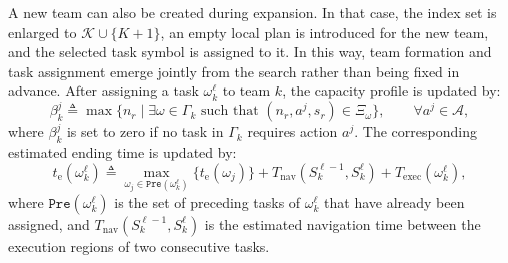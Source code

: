 A new team can also be created during expansion. In that case, the index set is
enlarged to $\mathcal{K}\cup\{K+1\}$, an empty local plan is introduced for the
new team, and the selected task symbol is assigned to it. In this way, team
formation and task assignment emerge jointly from the search rather than being
fixed in advance.
After assigning a task $\omega_k^\ell$ to team $k$, the capacity profile is
updated by:
\begin{equation}
\label{ch04:eq:update-constraint}
\beta_k^j \triangleq
\max\{n_r \mid \exists \omega\in\Gamma_k
\text{ such that } (n_r,a^j,s_r)\in\Xi_\omega\},
\qquad \forall a^j\in\mathcal{A},
\end{equation}
where $\beta_k^j$ is set to zero if no task in $\Gamma_k$ requires action
$a^j$. The corresponding estimated ending time is updated by:
\begin{equation}
\label{ch04:eq:estimated_time}
t_{\mathrm{e}}(\omega_k^\ell) \triangleq
\max_{\omega_j\in\texttt{Pre}(\omega_k^\ell)}
\bigl\{ t_{\mathrm{e}}(\omega_j) \bigr\}
+ T_{\mathrm{nav}}(S_k^{\ell-1},S_k^\ell)
+ T_{\mathrm{exec}}(\omega_k^\ell),
\end{equation}
where $\texttt{Pre}(\omega_k^\ell)$ is the set of preceding tasks of
$\omega_k^\ell$ that have already been assigned, and
$T_{\mathrm{nav}}(S_k^{\ell-1},S_k^\ell)$ is the estimated navigation time
between the execution regions of two consecutive tasks.

